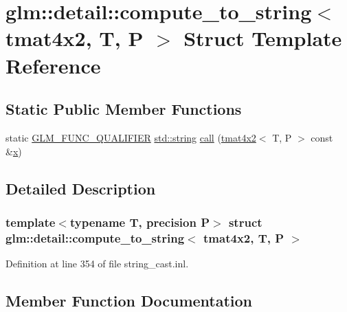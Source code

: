 \hypertarget{structglm_1_1detail_1_1compute__to__string_3_01tmat4x2_00_01_t_00_01_p_01_4}{}\section{glm\+::detail\+::compute\+\_\+to\+\_\+string$<$ tmat4x2, T, P $>$ Struct Template Reference}
\label{structglm_1_1detail_1_1compute__to__string_3_01tmat4x2_00_01_t_00_01_p_01_4}
\subsection*{Static Public Member Functions}
\begin{DoxyCompactItemize}
\item 
static \mbox{\hyperlink{setup_8hpp_a33fdea6f91c5f834105f7415e2a64407}{G\+L\+M\+\_\+\+F\+U\+N\+C\+\_\+\+Q\+U\+A\+L\+I\+F\+I\+ER}} \mbox{\hyperlink{glad_8h_ac83513893df92266f79a515488701770}{std\+::string}} \mbox{\hyperlink{structglm_1_1detail_1_1compute__to__string_3_01tmat4x2_00_01_t_00_01_p_01_4_a1371cdf230f35b3c1fbd8cfad23bd364}{call}} (\mbox{\hyperlink{structglm_1_1tmat4x2}{tmat4x2}}$<$ T, P $>$ const \&\mbox{\hyperlink{glad_8h_a92d0386e5c19fb81ea88c9f99644ab1d}{x}})
\end{DoxyCompactItemize}


\subsection{Detailed Description}
\subsubsection*{template$<$typename T, precision P$>$\newline
struct glm\+::detail\+::compute\+\_\+to\+\_\+string$<$ tmat4x2, T, P $>$}



Definition at line 354 of file string\+\_\+cast.\+inl.



\subsection{Member Function Documentation}
\mbox{\label{structglm_1_1detail_1_1compute__to__string_3_01tmat4x2_00_01_t_00_01_p_01_4_a1371cdf230f35b3c1fbd8cfad23bd364}} 
